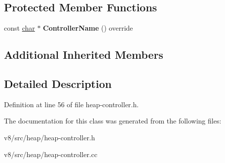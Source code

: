\subsection*{Protected Member Functions}
\begin{DoxyCompactItemize}
\item 
\mbox{\label{classv8_1_1internal_1_1HeapController_a0345a7d2b2f525e5d1402561819019fe}} 
const \mbox{\hyperlink{classchar}{char}} $\ast$ {\bfseries Controller\+Name} () override
\end{DoxyCompactItemize}
\subsection*{Additional Inherited Members}


\subsection{Detailed Description}


Definition at line 56 of file heap-\/controller.\+h.



The documentation for this class was generated from the following files\+:\begin{DoxyCompactItemize}
\item 
v8/src/heap/heap-\/controller.\+h\item 
v8/src/heap/heap-\/controller.\+cc\end{DoxyCompactItemize}

